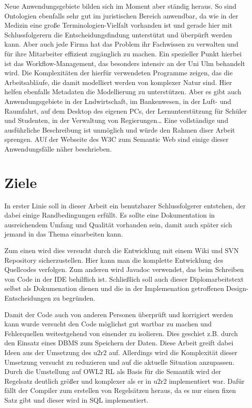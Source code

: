 Neue Anwendungsgebiete bilden sich im Moment aber ständig heraus. So sind Ontologien ebenfalls sehr gut im juristischen Bereich anwendbar, da wie in der Medizin eine große Terminologien-Vielfalt vorhanden ist und gerade hier mit Schlussfolgerern die Entscheidungsfindung unterstützt und überpürft werden kann.
Aber auch jede Firma hat das Problem ihr Fachwissen zu verwalten und für ihre Mitarbeiter effizient zugänglich zu machen. Ein spezieller Punkt hierbei ist das Workflow-Management, das besonders intensiv an der Uni Ulm behandelt wird. Die Komplexitäten der hierfür verwendeten Programme zeigen, das die Arbeitsabläufe, die damit modelliert werden von komplexer Natur sind. Hier helfen ebenfalls Metadaten die Modellierung zu unterstützen.
Aber es gibt auch Anwendungsgebiete in der Lndwirtschaft, im Bankenwesen, in der Luft- und Raumfahrt, auf dem Desktop des eigenen PCs, der Lernunterstützung für Schüler und Studenten, in der Verwaltung von Regierungen\ldots
Eine vollständige und ausführliche Beschreibung ist unmöglich und würde den Rahmen diser Arbeit sprengen. AUf der Webseite des W3C zum Semantic Web \cite{W3CUseCases} sind einige dieser Anwendungsfälle näher beschrieben.

\section{Ziele}
\label{abschnitt-ziele}

In erster Linie soll in dieser Arbeit ein benutzbarer Schlussfolgerer entstehen, der dabei einige Randbedingungen erfüllt. Es sollte eine Dokumentation in ausreichendem Umfang und Qualität vorhanden sein, damit auch später sich jemand in das Thema einarbeiten kann.

Zum einen wird dies versucht durch die Entwicklung mit einem Wiki und SVN Repository sicherzustellen. Hier kann man die komplette Entwicklung des Quellcodes verfolgen. Zum anderen wird Javadoc verwendet, das beim Schreiben von Code in der IDE behilflich ist. Schließlich soll auch dieser Diplomarbeitstext selbst als Dokumenation dienen und die in der Implemenation getroffenen Design-Entscheidungen zu begründen.

Damit der Code auch von anderen Personen überprüft und korrigiert werden kann wurde versucht den Code möglichst gut wartbar zu machen und Fehlerquellen weitestgehend von einender zu isolieren. Dies geschiet z.B. durch den Einsatz eines DBMS zum Speichern der Daten. Diese Arbeit greift dabei Ideen aus der Umsetzung des u2r2 \cite{Weithoehner2008} auf.
Allerdings wird die Komplexität dieser Umsetzung versucht zu reduzieren und auf die aktuelle Situation anzupassen. Durch die Umstellung auf OWL2 RL als Basis für die Semantik wird der Regelsatz deutlich größer und komplexer als er in u2r2 implementiert war. Dafür fällt der Compiler zum erstellen von Regelsätzen heraus, da es nur einen fixen Satz gibt und dieser wird in SQL implementiert.


